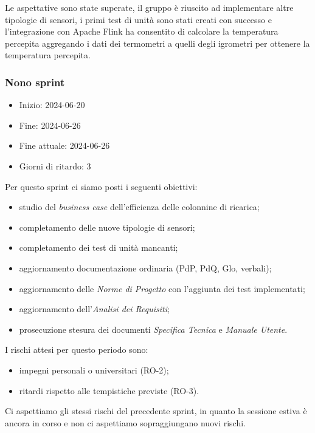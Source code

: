 Le aspettative sono state superate, il gruppo è riuscito ad implementare altre tipologie di sensori, i primi test di unità sono stati creati con successo e l'integrazione con Apache Flink ha consentito di calcolare la temperatura percepita aggregando i dati dei termometri a quelli degli igrometri per ottenere la temperatura percepita. 



\newpage
\subsubsection{Nono sprint}
\begin{itemize}
	\item Inizio: 2024-06-20
	\item Fine: 2024-06-26
	\item Fine attuale: 2024-06-26
	\item Giorni di ritardo: 3
\end{itemize}

Per questo sprint ci siamo posti i seguenti obiettivi:
\begin{itemize}
	\item studio del \textit{business case} dell'efficienza delle colonnine di ricarica;
	\item completamento delle nuove tipologie di sensori;
	\item completamento dei test di unità mancanti;
	\item aggiornamento documentazione ordinaria (PdP, PdQ, Glo, verbali);
	\item aggiornamento delle \textit{Norme di Progetto} con l'aggiunta dei test implementati;
	\item aggiornamento dell'\textit{Analisi dei Requisiti};
	\item prosecuzione stesura dei documenti \textit{Specifica Tecnica} e \textit{Manuale Utente}.
\end{itemize}

I rischi attesi per questo periodo sono:
\begin{itemize}
	\item impegni personali o universitari (RO-2);
	\item ritardi rispetto alle tempistiche previste (RO-3).
\end{itemize}
Ci aspettiamo gli stessi rischi del precedente sprint, in quanto la sessione estiva è ancora in corso e non ci aspettiamo sopraggiungano nuovi rischi.

